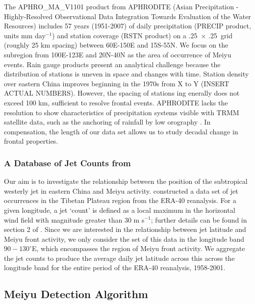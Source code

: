 \documentclass[draft,grl]{AGUTeX}
\begin{document}
\begin{article}
	The APHRO\_MA\_V1101 product from APHRODITE (Asian Precipitation - Highly-Resolved Observational Data Integration Towards Evaluation of the Water Resources) \citep{Yatagai2012} includes 57 years (1951-2007) of daily precipitation (PRECIP product, units mm day$^{-1}$) and station coverage (RSTN product) on a .25\textdegree\ $\times$ .25\textdegree\ grid (roughly 25 km spacing) between 60\textdegree E-150\textdegree E and 15\textdegree S-55\textdegree N. We focus on the subregion from 100E-123E and 20N-40N as the area of occurrence of Meiyu events. Rain gauge products present an analytical challenge because the distribution of stations is uneven in space and changes with time. Station density over eastern China improves beginning in the 1970s from X to Y (INSERT ACTUAL NUMBERS). However, the spacing of stations ing enerally does not exceed 100 km, sufficient to resolve frontal events. APHRODITE lacks the resolution to show characteristics of precipitation systems visible with TRMM satellite data, such as the anchoring of rainfall by low orography \citep{Xu2009}. In compensation, the length of our data set allows us to study decadal change in frontal properties.
	
\subsubsection{A Database of Jet Counts from \citep{Schiemann2009}} 

Our aim is to investigate the relationship between the position of the subtropical westerly jet in eastern China and Meiyu activity. \citep{Schiemann2009} constructed a data set of jet occurrences in the Tibetan Plateau region from the ERA-40 reanalysis.  For a given longitude, a jet `count'  is defined as a local maximum in the horizontal wind field with magnitude greater than $30$ m s$^{-1}$; further details can be found in section 2 of \citep{Schiemann2009}. Since we are interested in the relationship between jet latitude and Meiyu front activity, we only consider the set of this data in the longitude band $90-130^\circ$E, which encompasses the region of Meiyu front activity. We aggregate the jet counts to produce the average daily jet latitude across this across the longitude band for the entire period of the ERA-40 reanalysis, 1958-2001. 
	
\subsection{Meiyu Detection Algorithm}


\end{article}
\end{document}
